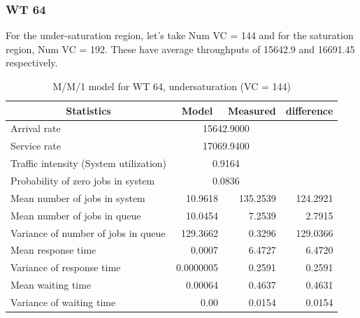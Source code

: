\documentclass[11pt,a4paper]{article}
\begin{document}
\subsubsection{WT 64}
For the under-saturation region, let's take Num VC = 144 and for the saturation region, Num VC = 192. These have average throughputs of 15642.9 and 16691.45 respectively.

\begin{table}[H]
	\centering
	\caption{M/M/1 model for WT 64, undersaturation (VC = 144)}
	\begin{tabular}{|l|r|r|r|}
		\hline
		\multicolumn{1}{|c|}{Statistics} & \multicolumn{1}{c|}{Model} & \multicolumn{1}{c|}{Measured} & \multicolumn{1}{c|}{difference} \\ \hline
		Arrival rate & \multicolumn{ 2}{c|}{15642.9000} & \multicolumn{1}{l|}{} \\ \hline
		Service rate & \multicolumn{ 2}{c|}{17069.9400} & \multicolumn{1}{l|}{} \\ \hline
		Traffic intensity (System utilization) & \multicolumn{ 2}{c|}{0.9164} & \multicolumn{1}{l|}{} \\ \hline
		Probability of zero jobs in system & \multicolumn{ 2}{c|}{0.0836} & \multicolumn{1}{l|}{} \\ \hline
		Mean number of jobs in system & 10.9618 & 135.2539 & 124.2921 \\ \hline
		Mean number of jobs in queue & 10.0454 & 7.2539 & 2.7915 \\ \hline
		Variance of number of jobs in queue & 129.3662 & 0.3296 & 129.0366 \\ \hline
		Mean response time & 0.0007 & 6.4727 & 6.4720 \\ \hline
		Variance of response time & 0.0000005 & 0.2591 & 0.2591 \\ \hline
		Mean waiting time & 0.00064 & 0.4637 & 0.4631 \\ \hline
		Variance of waiting time & 0.00 & 0.0154 & 0.0154 \\ \hline
	\end{tabular}
	\label{}
\end{table}
\end{document}
